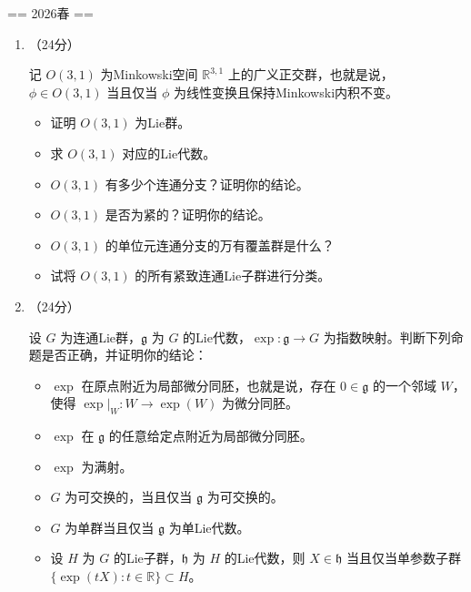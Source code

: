 
\newcommand{\g}{\mathfrak{g}}
\newcommand{\h}{\mathfrak{h}}
\newcommand{\Aut}{\operatorname{Aut}}
\newcommand{\Ad}{\operatorname{Ad}}

== 2026春 ==
\begin{enumerate}

\item[一、]（24分）

记 $O(3,1)$ 为Minkowski空间 $\mathbb{R}^{3,1}$ 上的广义正交群，也就是说，$\phi \in O(3,1)$ 当且仅当 $\phi$ 为线性变换且保持Minkowski内积不变。

\begin{itemize}[label=(\alph*)]
\item 证明 $O(3,1)$ 为Lie群。
\item 求 $O(3,1)$ 对应的Lie代数。
\item $O(3,1)$ 有多少个连通分支？证明你的结论。
\item $O(3,1)$ 是否为紧的？证明你的结论。
\item $O(3,1)$ 的单位元连通分支的万有覆盖群是什么？
\item 试将 $O(3,1)$ 的所有紧致连通Lie子群进行分类。
\end{itemize}

\item[二、]（24分）

设 $G$ 为连通Lie群，$\mathfrak{g}$ 为 $G$ 的Lie代数，$\exp : \mathfrak{g} \to G$ 为指数映射。判断下列命题是否正确，并证明你的结论：

\begin{itemize}
\item $\exp$ 在原点附近为局部微分同胚，也就是说，存在 $0\in \mathfrak{g}$ 的一个邻域 $W$，使得 $\exp|_{W} : W \to \exp(W)$ 为微分同胚。
\item $\exp$ 在 $\mathfrak{g}$ 的任意给定点附近为局部微分同胚。
\item $\exp$ 为满射。
\item $G$ 为可交换的，当且仅当 $\mathfrak{g}$ 为可交换的。
\item $G$ 为单群当且仅当 $\mathfrak{g}$ 为单Lie代数。
\item 设 $H$ 为 $G$ 的Lie子群，$\mathfrak{h}$ 为 $H$ 的Lie代数，则 $X \in \mathfrak{h}$ 当且仅当单参数子群 $\{\exp(tX) : t \in \mathbb{R}\} \subset H$。
\end{itemize}


\end{enumerate}
